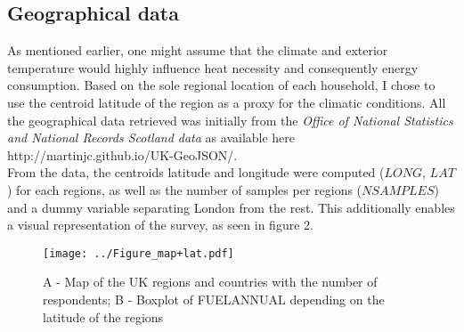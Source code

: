 \documentclass[12pt]{article}
\begin{document}
\subsection{Geographical data}
As mentioned earlier, one might assume that the climate and exterior temperature would highly influence heat necessity and consequently energy consumption. Based on the sole regional location of each household, I chose to use the centroid latitude of the region as a proxy for the climatic conditions. All the geographical data retrieved was initially from the \textit{Office of National Statistics and National Records Scotland data} as available here http://martinjc.github.io/UK-GeoJSON/.\\
From the data, the centroids latitude and longitude were computed ($LONG$, $LAT$) for each regions, as well as the number of samples per regions ($NSAMPLES$) and a dummy variable separating London from the rest. This additionally enables a visual representation of the survey, as seen in figure 2.

\begin{figure}[!h]
\begin{center}
\texttt{[image: ../Figure\_map+lat.pdf]}
\end{center}
\caption{\footnotesize{A - Map of the UK regions and countries with the number of respondents; B - Boxplot of FUELANNUAL depending on the latitude of the regions}}
\label{Figure 3}
\end{figure}
\end{document}
